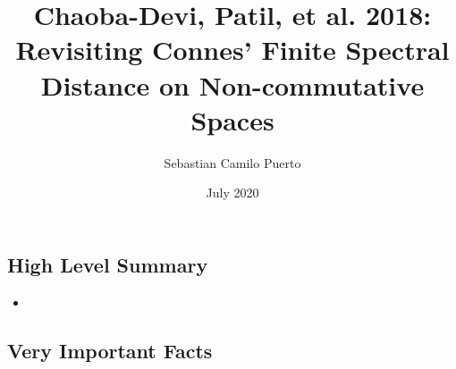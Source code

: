 \documentclass{article}
\title{Chaoba-Devi, Patil, et al. 2018: Revisiting Connes' Finite Spectral Distance on Non-commutative Spaces}
\author{Sebastian Camilo Puerto}
\date{July 2020}
\begin{document}
\maketitle

\tableofcontents

\subsection{High Level Summary}

    \begin{itemize}

    \item 
    
    \end{itemize}

\subsection{Very Important Facts}
\end{document}
